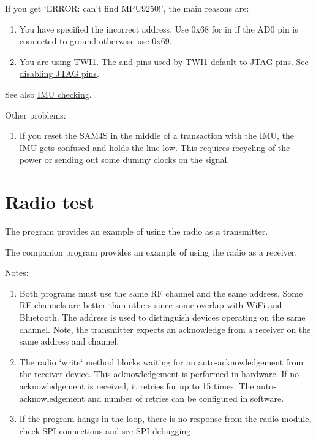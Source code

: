 If you get `ERROR: can't find MPU9250!', the main reasons are:

\begin{enumerate}
\item
  You have specified the incorrect address.  Use 0x68 for
   in  if the AD0 pin is connected to
  ground otherwise use 0x69.
\item
  You are using TWI1. The  and  pins used by TWI1
  default to JTAG pins. See
  \protect\hyperref[disabling-jtag-pins]{disabling JTAG pins}.
\end{enumerate}
%
See also \protect\hyperref[checking-IMU]{IMU checking}.

Other problems:
%
\begin{enumerate}
\item If you reset the SAM4S in the middle of a transaction with the
IMU, the IMU gets confused and holds the  line low. This
requires recycling of the power or sending out some dummy clocks on
the  signal.
\end{enumerate}


\section{Radio test}
\label{radio-test}

The program  provides
an example of using the radio as a transmitter.

The companion program
 provides an example
of using the radio as a receiver.

Notes:
%
\begin{enumerate}
\item
  Both programs must use the same RF channel and the same address. Some
  RF channels are better than others since some overlap with WiFi
  and Bluetooth. The address is used to distinguish devices
  operating on the same channel. Note, the transmitter expects an
  acknowledge from a receiver on the same address and channel.
\item
  The radio `write` method blocks waiting for an auto-acknowledgement
  from the receiver device. This acknowledgement is performed in
  hardware. If no acknowledgement is received, it retries for up to 15
  times. The auto-acknowledgement and number of retries can be
  configured in software.

\item If the program hangs in the  loop, there is no
  response from the radio module, check SPI connections and see
  \hyperref[debugging_Spi]{SPI debugging}.
  
\end{enumerate}

